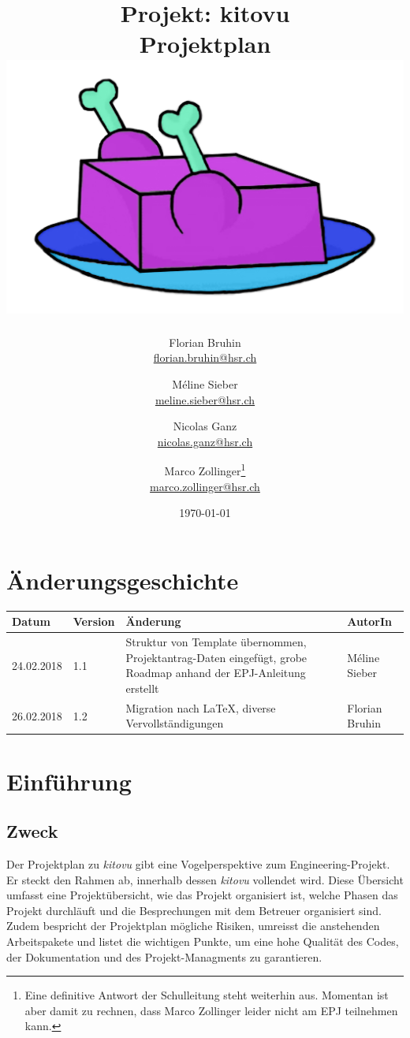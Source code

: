 \documentclass[a4paper]{article}
\begin{document}
\title{
  Projekt: kitovu \\
  \Large{Projektplan} \\[3em]
  \includegraphics[width=20em]{../../img/logo/kitovu.jpg}
}
\author{
  Florian Bruhin \\ \url{florian.bruhin@hsr.ch} \and
  Méline Sieber \\ \url{meline.sieber@hsr.ch} \and
  Nicolas Ganz \\ \url{nicolas.ganz@hsr.ch} \and
  Marco Zollinger\footnote{Eine definitive Antwort der Schulleitung steht
    weiterhin aus. Momentan ist aber damit zu rechnen, dass Marco Zollinger
    leider nicht am EPJ teilnehmen kann.} \\ \url{marco.zollinger@hsr.ch}}
\date{\today}

\maketitle
\pagebreak

\section*{Änderungsgeschichte}

\begin{tabular}{llp{20em}l}
\toprule
Datum & Version & Änderung & AutorIn \\
\midrule
24.02.2018 & 1.1 & Struktur von Template übernommen, Projektantrag-Daten eingefügt, grobe Roadmap anhand der EPJ-Anleitung erstellt & Méline Sieber \\
26.02.2018 & 1.2 & Migration nach \LaTeX{}, diverse Vervollständigungen & Florian Bruhin \\
\bottomrule
\end{tabular}
\pagebreak

\section{Einführung}
\subsection{Zweck}
Der Projektplan zu \emph{kitovu} gibt eine Vogelperspektive zum Engineering-Projekt. Er steckt den Rahmen ab, innerhalb dessen \emph{kitovu} vollendet wird. Diese Übersicht umfasst eine Projektübersicht, wie das Projekt organisiert ist, welche Phasen das Projekt durchläuft und die Besprechungen mit dem Betreuer organisiert sind. Zudem bespricht der Projektplan mögliche Risiken, umreisst die anstehenden Arbeitspakete und listet die wichtigen Punkte, um eine hohe Qualität des Codes, der Dokumentation und des Projekt-Managments zu garantieren.
\end{document}
